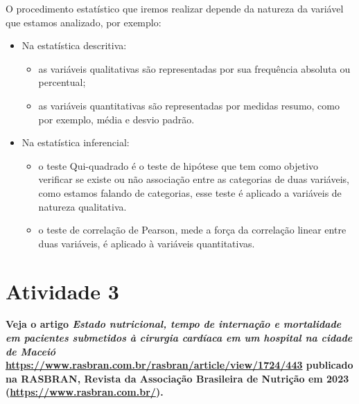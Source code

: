 \documentclass[
]{book}
\begin{document}
O procedimento estatístico que iremos realizar depende da natureza da variável que estamos analizado, por exemplo:

\begin{itemize}
\item
  Na estatística descritiva:

  \begin{itemize}
  \item
    as variáveis qualitativas são representadas por sua frequência absoluta ou percentual;
  \item
    as variáveis quantitativas são representadas por medidas resumo, como por exemplo, média e desvio padrão.
  \end{itemize}
\item
  Na estatística inferencial:

  \begin{itemize}
  \item
    o teste Qui-quadrado é o teste de hipótese que tem como objetivo verificar se existe ou não associação entre as categorias de duas variáveis, como estamos falando de categorias, esse teste é aplicado a variáveis de natureza qualitativa.
  \item
    o teste de correlação de Pearson, mede a força da correlação linear entre duas variáveis, é aplicado à variáveis quantitativas.
  \end{itemize}
\end{itemize}

\hypertarget{atividade-3}{%
\section{Atividade 3}\label{atividade-3}}

\textbf{Veja o artigo \emph{Estado nutricional, tempo de internação e mortalidade em pacientes submetidos à cirurgia cardíaca em um hospital na cidade de Maceió} \url{https://www.rasbran.com.br/rasbran/article/view/1724/443} publicado na RASBRAN, Revista da Associação Brasileira de Nutrição em 2023 (\url{https://www.rasbran.com.br/}).}
\end{document}

